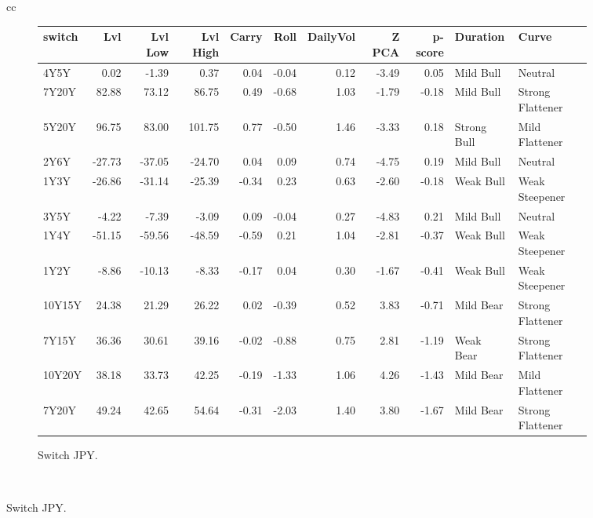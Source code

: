 \documentclass[a4paper,twoside]{report}
\begin{document}
\begin{figure}[htbp]
\begin{tabular}[c]{cc}
\begin{subfigure}[c]{0.5\textwidth}
\caption{Switch JPY.}
\label{fig:Switch JPY}
\begin{adjustbox}{max width=\textwidth}
\begin{tabular}{lrrrrrrrrll}
\hline
 switch &    Lvl &  Lvl Low &  Lvl High &  Carry &  Roll &  DailyVol &  Z PCA &  p-score &     Duration &             Curve \\
\hline
   4Y5Y &   0.02 &    -1.39 &      0.37 &   0.04 & -0.04 &      0.12 &  -3.49 &     0.05 &    Mild Bull &           Neutral \\
  7Y20Y &  82.88 &    73.12 &     86.75 &   0.49 & -0.68 &      1.03 &  -1.79 &    -0.18 &    Mild Bull &  Strong Flattener \\
  5Y20Y &  96.75 &    83.00 &    101.75 &   0.77 & -0.50 &      1.46 &  -3.33 &     0.18 &  Strong Bull &    Mild Flattener \\
   2Y6Y & -27.73 &   -37.05 &    -24.70 &   0.04 &  0.09 &      0.74 &  -4.75 &     0.19 &    Mild Bull &           Neutral \\
   1Y3Y & -26.86 &   -31.14 &    -25.39 &  -0.34 &  0.23 &      0.63 &  -2.60 &    -0.18 &    Weak Bull &    Weak Steepener \\
   3Y5Y &  -4.22 &    -7.39 &     -3.09 &   0.09 & -0.04 &      0.27 &  -4.83 &     0.21 &    Mild Bull &           Neutral \\
   1Y4Y & -51.15 &   -59.56 &    -48.59 &  -0.59 &  0.21 &      1.04 &  -2.81 &    -0.37 &    Weak Bull &    Weak Steepener \\
   1Y2Y &  -8.86 &   -10.13 &     -8.33 &  -0.17 &  0.04 &      0.30 &  -1.67 &    -0.41 &    Weak Bull &    Weak Steepener \\
 10Y15Y &  24.38 &    21.29 &     26.22 &   0.02 & -0.39 &      0.52 &   3.83 &    -0.71 &    Mild Bear &  Strong Flattener \\
  7Y15Y &  36.36 &    30.61 &     39.16 &  -0.02 & -0.88 &      0.75 &   2.81 &    -1.19 &    Weak Bear &  Strong Flattener \\
 10Y20Y &  38.18 &    33.73 &     42.25 &  -0.19 & -1.33 &      1.06 &   4.26 &    -1.43 &    Mild Bear &    Mild Flattener \\
  7Y20Y &  49.24 &    42.65 &     54.64 &  -0.31 & -2.03 &      1.40 &   3.80 &    -1.67 &    Mild Bear &  Strong Flattener \\
\hline
\end{tabular}
\end{adjustbox}
 \end{subfigure}\\
 

\end{tabular}
\end{figure}
\end{document}
